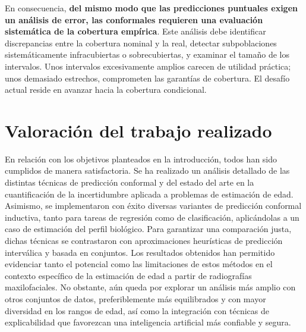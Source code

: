 En consecuencia, \textbf{del mismo modo que las predicciones puntuales exigen un análisis de error, las conformales requieren una evaluación sistemática de la cobertura empírica}. Este análisis debe identificar discrepancias entre la cobertura nominal y la real, detectar subpoblaciones sistemáticamente infracubiertas o sobrecubiertas, y examinar el tamaño de los intervalos. Unos intervalos excesivamente amplios carecen de utilidad práctica; unos demasiado estrechos, comprometen las garantías de cobertura. El desafío actual reside en avanzar hacia la cobertura condicional.


\section{Valoración del trabajo realizado}


En relación con los objetivos planteados en la introducción, todos han sido cumplidos de manera satisfactoria. Se ha realizado un análisis detallado de las distintas técnicas de predicción conformal y del estado del arte en la cuantificación de la incertidumbre aplicada a problemas de estimación de edad. Asimismo, se implementaron con éxito diversas variantes de predicción conformal inductiva, tanto para tareas de regresión como de clasificación, aplicándolas a un caso de estimación del perfil biológico. Para garantizar una comparación justa, dichas técnicas se contrastaron con aproximaciones heurísticas de predicción interválica y basada en conjuntos. Los resultados obtenidos han permitido evidenciar tanto el potencial como las limitaciones de estos métodos en el contexto específico de la estimación de edad a partir de radiografías maxilofaciales. No obstante, aún queda por explorar un análisis más amplio con otros conjuntos de datos, preferiblemente más equilibrados y con mayor diversidad en los rangos de edad, así como la integración con técnicas de explicabilidad que favorezcan una inteligencia artificial más confiable y segura. 


